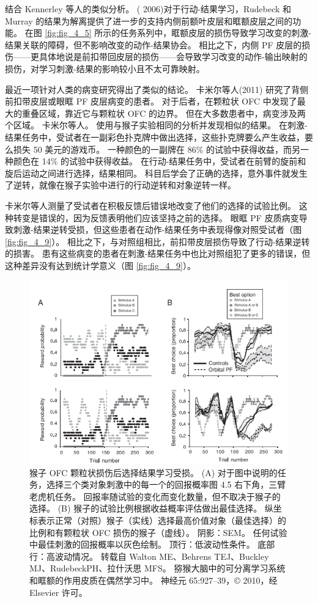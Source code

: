 结合 Kennerley 等人的类似分析。 ( 2006)对于行动-结果学习，Rudebeck 和 Murray 的结果为解离提供了进一步的支持内侧前额叶皮层和眶额皮层之间的功能。
在图 \ref{fig:fig_4_5} 所示的任务系列中，眶额皮层的损伤导致学习改变的刺激-结果关联的障碍，但不影响改变的动作-结果协会。
相比之下，内侧 PF 皮层的损伤——更具体地说是前扣带回皮层的损伤——会导致学习改变的动作-输出映射的损伤，对学习刺激-结果的影响较小且不太可靠映射。\par
最近一项针对人类的病变研究得出了类似的结论。 卡米尔等人(2011) 研究了背侧前扣带皮层或眼眶 PF 皮层病变的患者。 对于后者，在颗粒状 OFC 中发现了最大的重叠区域，靠近它与颗粒状 OFC 的边界。 但在大多数患者中，病变涉及两个区域。 卡米尔等人。 使用与猴子实验相同的分析并发现相似的结果。 在刺激-结果任务中，受试者在一副彩色扑克牌中做出选择，这些扑克牌要么产生收益，要么损失 50 美元的游戏币。 一种颜色的一副牌在 86\% 的试验中获得收益，而另一种颜色在 14\% 的试验中获得收益。 在行动-结果任务中，受试者在前臂的旋前和旋后运动之间进行选择，结果相同。 科目后学会了正确的选择，意外事件就发生了逆转，就像在猴子实验中进行的行动逆转和对象逆转一样。\par
卡米尔等人测量了受试者在积极反馈后错误地改变了他们的选择的试验比例。 这种转变是错误的，因为反馈表明他们应该坚持之前的选择。 眼眶 PF 皮质病变导致刺激-结果逆转受损，但这些患者在动作-结果任务中表现得像对照受试者（图 \ref{fig:fig_4_9}）。 相比之下，与对照组相比，前扣带皮层损伤导致了行动-结果逆转的损害。 患有这些病变的患者在刺激-结果任务中也比对照组犯了更多的错误，但这种差异没有达到统计学意义（图 \ref{fig:fig_4_9}）。\par
\begin{figure}[!htb]
	\centering
	\includegraphics{image_pfc/Fig_4_6}
	\caption{猴子 OFC 颗粒状损伤后选择结果学习受损。 (A) 对于图中说明的任务，选择三个类对象刺激中的每一个的回报概率图 4.5 右下角，三臂老虎机任务。 回报率随试验的变化而变化数量，但不取决于猴子的选择。 (B) 猴子的试验比例根据收益概率评估做出最佳选择。 纵坐标表示正常（对照）猴子（实线）选择最高价值对象（最佳选择）的比例和有颗粒状 OFC 损伤的猴子（虚线）。 阴影：SEM。 任何试验中最佳刺激的回报概率以灰色绘制。 顶行：低波动性条件。 底部行：高波动情况。 转载自 Walton ME、Behrens TEJ、Buckley MJ、RudebeckPH、拉什沃思 MFS。 猕猴大脑中的可分离学习系统和眶额的作用皮质在偶然学习中。 神经元 65:927–39，© 2010，经 Elsevier 许可。}
	\label{fig:fig_4_6}
\end{figure}
